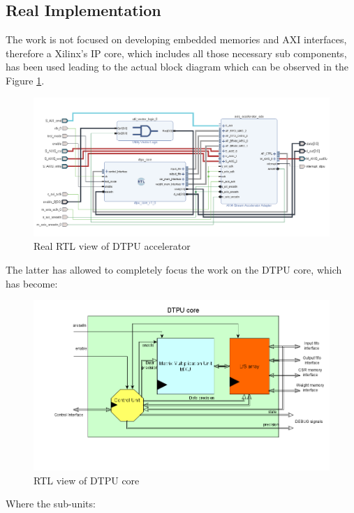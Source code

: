\subsection{Real Implementation}
The work is not focused on developing embedded memories and AXI interfaces, therefore a Xilinx's IP core, which includes all those necessary sub components, has been used\cite{paper:43} leading to the actual block diagram which can be observed in the Figure \ref{fig:rtlaccel}.
\begin{figure}[H]
\centering
\captionsetup{justification=centering}
\includegraphics[scale=0.8,angle=0]{./figure/accelerator_schematic.png}
\caption{Real RTL view of DTPU accelerator}
\label{fig:rtlaccel}
\end{figure} 
The latter has allowed to completely focus the work on the DTPU core, which has become:
\begin{figure}[H]
\centering
\captionsetup{justification=centering}
\includegraphics[scale=0.45,angle=0]{./figure/dtpu_core.png}
\caption{RTL view of DTPU core}
\label{fig:dtpucore}
\end{figure} 
Where the sub-units:
